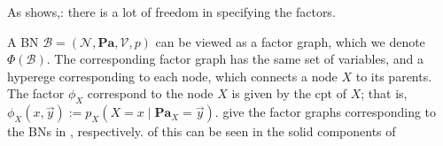 \documentclass{article}
\newcommand{\V}{\mathcal V}
\newcommand{\N}{\mathcal N}
\newcommand\Pa{\mathbf{Pa}}
\numberwithin{equation}{section}
\begin{document}
As  shows,: there is a
lot of freedom in specifying the factors.

A BN $\mathcal B = (\N, \Pa, \V, p)$ can be viewed
as a factor graph, which we denote $\Phi(\mathcal B)$.
The corresponding factor graph has the same set of variables, and a
hyperege corresponding to each node, which connects a node $X$ to its
parents.
The factor $\phi_X$ correspond to the node $X$ is given by the cpt of
$X$; that is, $\phi_X(x,
\vec{y}) := p_X( X \!\!=\!\! x \mid 
\Pa_X \!\!=\!\! \vec y)$.
 give the factor graphs corresponding  to
the BNs in , respectively.  
of this can be seen in the solid components of
	
\end{document}
